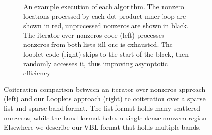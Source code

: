 \begin{figure}
    \begin{subfigure}{\linewidth}
      \begin{minipage}[t]{0.5\linewidth-2pt}
        
      \end{minipage}\hspace{4pt}%
      \begin{minipage}[t]{0.5\linewidth-2pt}
        
      \end{minipage}
      \caption{An example execution of each algorithm. The
      nonzero locations processed by each dot product inner loop are shown in red,
      unprocessed nonzeros are shown in black. The iterator-over-nonzeros code
      (left) processes nonzeros from both lists till one is exhausted. The looplet
      code (right) skips to the start of the block, then randomly accesses it,
      thus improving asymptotic efficiency.}\label{fig:dot-comp:touch}
    \end{subfigure}
  
    \caption{Coiteration comparison between an iterator-over-nonzeros approach
    (left) and our Looplets approach (right) to coiteration over a sparse list and sparse
    band format.  The list format holds many scattered nonzeros, while the band
    format holds a single dense nonzero region. Elsewhere we describe our VBL
    format that holds multiple bands.}\label{fig:dot-comp}
  \end{figure}